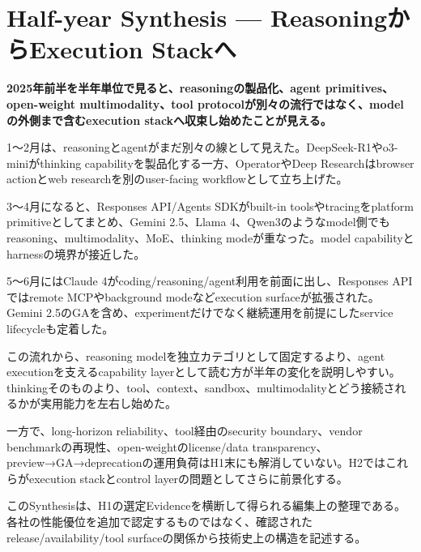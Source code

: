 \section{Half-year Synthesis — ReasoningからExecution Stackへ}
\noindent\textbf{2025年前半を半年単位で見ると、reasoningの製品化、agent primitives、open-weight multimodality、tool protocolが別々の流行ではなく、modelの外側まで含むexecution stackへ収束し始めたことが見える。}\autocite{src-421ee9af3f80,src-4ec03078d316,src-78593f4b387f}

1〜2月は、reasoningとagentがまだ別々の線として見えた。DeepSeek-R1やo3-miniがthinking capabilityを製品化する一方、OperatorやDeep Researchはbrowser actionとweb researchを別のuser-facing workflowとして立ち上げた。\autocite{src-421ee9af3f80}


3〜4月になると、Responses API/Agents SDKがbuilt-in toolsやtracingをplatform primitiveとしてまとめ、Gemini 2.5、Llama 4、Qwen3のようなmodel側でもreasoning、multimodality、MoE、thinking modeが重なった。model capabilityとharnessの境界が接近した。\autocite{src-05f285e9757b,src-3e4a3f3b3d83,src-421ee9af3f80,src-78593f4b387f}


5〜6月にはClaude 4がcoding/reasoning/agent利用を前面に出し、Responses APIではremote MCPやbackground modeなどexecution surfaceが拡張された。Gemini 2.5のGAを含め、experimentだけでなく継続運用を前提にしたservice lifecycleも定着した。\autocite{src-4ec03078d316,src-9257c39d4172}


この流れから、reasoning modelを独立カテゴリとして固定するより、agent executionを支えるcapability layerとして読む方が半年の変化を説明しやすい。thinkingそのものより、tool、context、sandbox、multimodalityとどう接続されるかが実用能力を左右し始めた。\autocite{src-421ee9af3f80,src-4ec03078d316,src-78593f4b387f}


一方で、long-horizon reliability、tool経由のsecurity boundary、vendor benchmarkの再現性、open-weightのlicense/data transparency、preview→GA→deprecationの運用負荷はH1末にも解消していない。H2ではこれらがexecution stackとcontrol layerの問題としてさらに前景化する。\autocite{src-05f285e9757b,src-3e4a3f3b3d83,src-9257c39d4172}


\begin{claimboundary}
このSynthesisは、H1の選定Evidenceを横断して得られる編集上の整理である。各社の性能優位を追加で認定するものではなく、確認されたrelease/availability/tool surfaceの関係から技術史上の構造を記述する。
\end{claimboundary}
